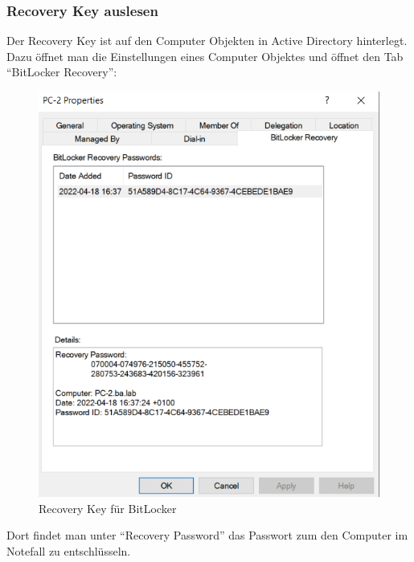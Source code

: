 \subsubsection{Recovery Key auslesen}
Der Recovery Key ist auf den Computer Objekten in Active Directory hinterlegt.
Dazu öffnet man die Einstellungen eines Computer Objektes und öffnet den Tab ``BitLocker Recovery'':
\begin{figure}[H]
    \centering
    \includegraphics[width=0.7\linewidth]{../img/Encryption/bitlocker-recovery.png}
    \caption{Recovery Key für BitLocker}
\end{figure}
Dort findet man unter ``Recovery Password'' das Passwort zum den Computer im Notefall zu entschlüsseln.